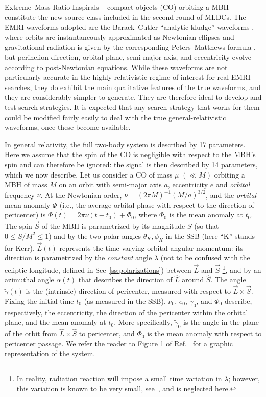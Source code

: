 \documentclass[12pt]{iopart}
\begin{document}
Extreme--Mass-Ratio Inspirals -- compact objects (CO) orbiting a MBH -- constitute the new source class included in the second round of MLDCs. The EMRI waveforms adopted are the Barack--Cutler ``analytic kludge'' waveforms \cite{BC}, where orbits are instantaneously approximated as Newtonian ellipses and gravitational radiation is given by the corresponding Peters--Matthews formula \cite{pm}, but perihelion direction, orbital plane, semi-major axis, and eccentricity evolve according to post-Newtonian equations. While these waveforms are not particularly accurate in the highly relativistic regime of interest for real EMRI searches, they do exhibit the main qualitative features of the true waveforms, and they are considerably simpler to generate.  They are therefore ideal to develop and test search strategies. It is expected that any search strategy that works for them could be modified fairly easily to deal with the true general-relativistic waveforms, once these become available.

In general relativity, the full two-body system is described by 17 parameters. Here we assume that the spin of the CO is negligible with respect to the MBH's spin and can therefore be ignored: the signal is then described by 14 parameters, which we now describe. Let us consider a CO of mass $\mu$ $(\ll M)$ orbiting a MBH of mass $M$ on an orbit with semi-major axis $a$, eccentricity $e$ and \emph{orbital} frequency $\nu$. At the Newtonian order,  $\nu = (2\pi M)^{-1} (M/a)^{3/2}$, and the \emph{orbital} mean anomaly $\Phi$ (i.e., the average orbital phase with respect to the direction of pericenter) is $\Phi(t) = 2\pi\nu (t-t_0) +\Phi_0$, where  $\Phi_0$ is the mean anomaly at $t_0$. The spin $\vec S$ of the MBH is parametrized by its magnitude $S$ (so that $0 \le S/M^2 \le 1$) and by the two polar angles $\theta_K,\phi_K$ in the SSB (here ``K'' stands for Kerr). $\vec L(t)$ represents the time-varying orbital angular momentum: its direction is parametrized by the \emph{constant} angle $\lambda$ (not to be confused with the ecliptic longitude, defined in Sec~\ref{ss:polarizations}) between $\vec L$ and $\vec S$%
\footnote{In reality, radiation reaction will impose a small time variation in $\lambda$; however, this variation is known to be very small, see~\cite{scott1}, and is neglected here.}, and by an azimuthal angle $\alpha(t)$ that describes the direction of $\hat L$ around $\hat S$. The angle $\tilde\gamma(t)$ is the (intrinsic) direction of pericenter, measured with respect to $\vec L\times\vec S$. Fixing the initial time $t_0$ (as measured in the SSB), $\nu_0$, $e_0$, $\tilde\gamma_0$, and $\Phi_0$ describe, respectively, the eccentricity, the direction of the pericenter within the orbital plane, and the mean anomaly at $t_0$. More specifically, $\tilde\gamma_0$ is the angle in the plane of the orbit from $\hat L \times \hat S$ to pericenter, and $\Phi_0$ is the mean anomaly with respect to pericenter passage. We refer the reader to Figure 1 of Ref.~\cite{BC} for a graphic representation of the system.
\end{document}

